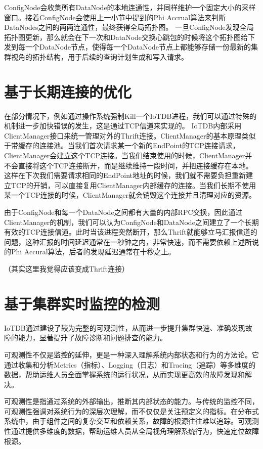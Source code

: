ConfigNode会收集所有DataNode的本地连通性，并同样维护一个固定大小的采样窗口。接着ConfigNode会使用上一小节中提到的Phi Accrual算法来判断DataNodes之间的两两连通性，最终获得全局拓扑图。
一旦ConfigNode发现全局拓扑图更新，那么就会在下一次和DataNode交换心跳包的时候将这个拓扑图给下发到每一个DataNode节点，使得每一个DataNode节点上都能够存储一份最新的集群视角的拓扑结构，用于后续的查询计划生成和写入请求。


\section{基于长期连接的优化}

在部分情况下，例如通过操作系统强制Kill一个IoTDB进程，我们可以通过特殊的机制进一步加快错误的发生，这是通过TCP信道来实现的。
IoTDB内部采用ClientManager接口来统一管理对外的Thrift连接。ClientManager的基本原理类似于带缓存的连接池。当我们首次请求某一个新的EndPoint的TCP连接请求，ClientManager会建立这个TCP连接。当我们结束使用的时候，ClientManager并不会直接将这个TCP连接断开，而是继续维持一段时间，并把连接缓存在本地。这样在下次我们需要请求相同的EndPoint地址的时候，我们就不需要负担重新建立TCP的开销，可以直接复用ClientManager内部缓存的连接。当我们长期不使用某一个TCP连接的时候，ClientManager就会销毁这个连接并且清理对应的资源。

由于ConfigNode和每一个DataNode之间都有大量的内部RPC交换，因此通过ClientManager的机制，我们可以认为ConfigNode和DataNode之间建立了一个长期有效的TCP连接信道。此时当该进程突然断开，那么Thrift就能够立马汇报信道的问题，这种汇报的时间延迟通常在一秒钟之内，非常快速，而不需要依赖上述所说的Phi Accural算法，后者的发现延迟通常在十秒之上。


（其实这里我觉得应该变成Thrift连接）


\section{基于集群实时监控的检测}

IoTDB通过建设了较为完整的可观测性，从而进一步提升集群快速、准确发现故障的能力，显著提升了故障诊断和问题排查的能力。

可观测性不仅是监控的延伸，更是一种深入理解系统内部状态和行为的方法论。它通过收集和分析Metrics（指标）、Logging（日志）和Tracing（追踪）等多维度的数据，帮助运维人员全面掌握系统的运行状况，从而实现更高效的故障发现和解决。

可观测性是指通过系统的外部输出，推断其内部状态的能力。与传统的监控不同，可观测性强调对系统行为的深层次理解，而不仅仅是关注预定义的指标。在分布式系统中，由于组件之间的复杂交互和依赖关系，故障的根源往往难以追踪。可观测性通过提供多维度的数据，帮助运维人员从全局视角理解系统行为，快速定位故障根源。

